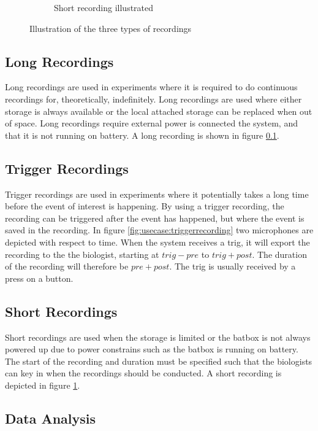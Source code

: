 \begin{figure}
\begin{subfigure}[b]{0.3\textwidth}
        \caption{Short recording illustrated}
        \label{fig:usecase:shortrecording}
    \end{subfigure}
    \caption{Illustration of the three types of recordings}\label{fig:usecase:recordingtypes}
\end{figure}
\subsection{Long Recordings}\label{sec:usecase:longrecording}
Long recordings are used in experiments where it is required to do continuous recordings for, theoretically, indefinitely. Long recordings are used where either storage is always available or the local attached storage can be replaced when out of space. Long recordings  require external power is connected the system, and that it is not running on battery. A long recording is shown in figure \ref{sec:usecase:longrecording}.

\subsection{Trigger Recordings}\label{sec:usecase:triggerrecording}
Trigger recordings are used in experiments where it potentially takes a long time before the event of interest is happening. By using a trigger recording, the recording can be triggered after the event has happened, but where the event is saved in the recording. In figure \ref{fig:usecase:triggerrecording} two microphones are depicted with respect to time. When the system receives a trig, it will export the recording to the the biologist, starting at $trig-pre$ to $trig+post$. The duration of the recording will therefore be $pre+post$. The trig is usually received by a press on a button.

\subsection{Short Recordings}\label{sec:usecase:shortrecording}
Short recordings are used when the storage is limited or the batbox is not always powered up due to power constrains such as the batbox is running on battery. The start of the recording and duration must be specified such that the biologists can key in when the recordings should be conducted.
A short recording is depicted in figure \ref{fig:usecase:shortrecording}.

\subsection{Data Analysis}

